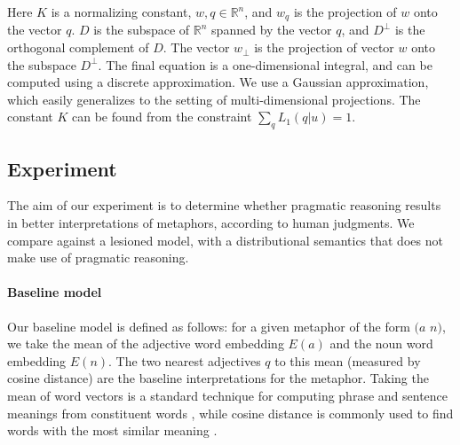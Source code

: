\documentclass[9pt,twocolumn,twoside,lineno]{pnas-new}
\begin{document}
{	Here $K$ is a normalizing constant, $w, q\in \mathbb{R}^n$, and $w_q$ is the projection of $w$ onto the vector $q$. $D$ is the subspace of $\mathbb{R}^n$ spanned by the vector $q$, and $D^\bot$ is the orthogonal complement of $D$. 
	The vector $w_\bot$ is the projection of vector $w$ onto the subspace $D^\bot$. The final equation is a one-dimensional integral, and can be computed using a discrete approximation. We use a Gaussian approximation, which easily generalizes to the setting of multi-dimensional projections. The constant $K$ can be found from the constraint $\sum_q L_1(q|u) = 1$.




\subsection*{Experiment}

		The aim of our experiment is to determine whether pragmatic reasoning results in better interpretations of metaphors, according to human judgments. We compare against a lesioned model, with a distributional semantics that does not make use of pragmatic reasoning.

		\paragraph{Baseline model}
		Our baseline model is defined as follows: for a given metaphor of the form $(a$ $n)$, we take the mean of the adjective word embedding $E(a)$ and the noun word embedding $E(n)$. The two nearest adjectives $q$ to this mean (measured by cosine distance) are the baseline interpretations for the metaphor. Taking the mean of word vectors is a standard technique for computing phrase and sentence meanings from constituent words \cite{mitchell2010composition,grefenstette2013category,socher2013recursive}, while cosine distance is commonly used to find words with the most similar meaning \cite{pennington2014glove}.



			


}
\end{document}
